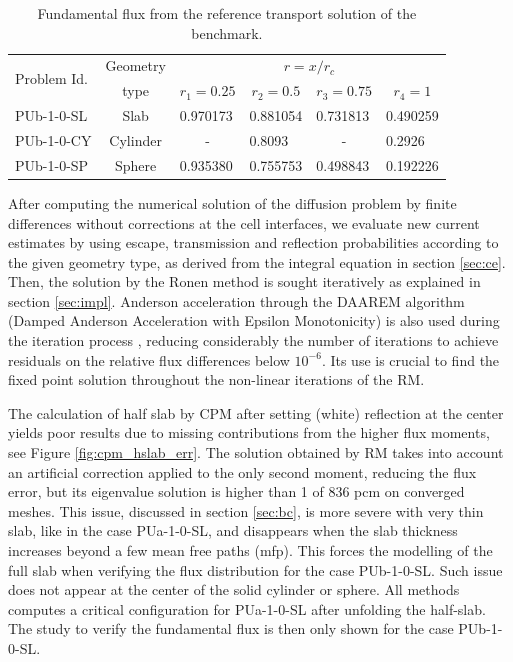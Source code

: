 \documentclass{ictt26}
\begin{document}
\begin{table}[hbt]
\centering
\caption{Fundamental flux from the reference transport solution of the benchmark.}\label{tab:rff}
\begin{tabular}{l|c|llll}
\multirow{2}{*}{Problem Id.} & Geometry & \multicolumn{4}{c}{$r=x/r_c$}\\ \cline{3-6}
 & type & \multicolumn{1}{c}{$r_1=0.25$} & \multicolumn{1}{c}{$r_2=0.5$} & \multicolumn{1}{c}{$r_3=0.75$} & \multicolumn{1}{c}{$r_4=1$}\\ \hline
PUb-1-0-SL & Slab     & 0.970173 & 0.881054  & 0.731813 &  0.490259\\
PUb-1-0-CY & Cylinder & \multicolumn{1}{c}{-} & 0.8093     & \multicolumn{1}{c}{-} & 0.2926\\
PUb-1-0-SP & Sphere   & 0.935380 & 0.755753 & 0.498843 & 0.192226
\end{tabular}
\end{table}

After computing the numerical solution of the diffusion problem by finite differences without corrections at the cell interfaces, we evaluate new current estimates by using escape, transmission and reflection probabilities according to the given geometry type, as derived from the integral equation in section \ref{sec:ce}. Then, the solution by the Ronen method is sought iteratively as explained in section \ref{sec:impl}. Anderson acceleration through the DAAREM algorithm (Damped Anderson Acceleration with Epsilon Monotonicity) is also used during the iteration process \cite{henderson2019damped}, reducing considerably the number of iterations to achieve residuals on the relative flux differences below $10^{-6}$. Its use is crucial to find the fixed point solution throughout the non-linear iterations of the RM.

The calculation of half slab by CPM after setting (white) reflection at the center yields poor results due to missing contributions from the higher flux moments, see Figure \ref{fig:cpm_hslab_err}. The solution obtained by RM takes into account an artificial correction applied to the only second moment, reducing the flux error, but its eigenvalue solution is higher than 1 of 836 pcm on converged meshes. This issue, discussed in section \ref{sec:bc}, is more severe with very thin slab, like in the case PUa-1-0-SL, and disappears when the slab thickness increases beyond a few mean free paths (mfp). This forces the modelling of the full slab when verifying the flux distribution for the case PUb-1-0-SL. Such issue does not appear at the center of the solid cylinder or sphere. %
All methods computes a critical configuration for PUa-1-0-SL after unfolding the half-slab. The study to verify the fundamental flux is then only shown for the case PUb-1-0-SL.
\end{document}
